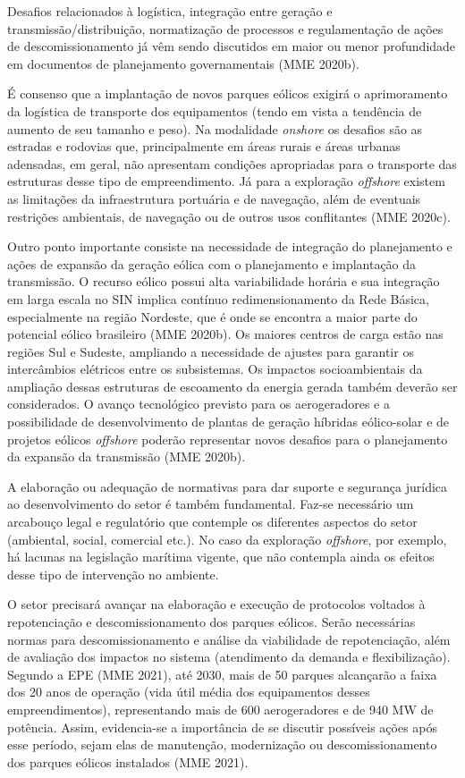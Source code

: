 \documentclass[
  oneside]{scrbook}
\begin{document}
Desafios relacionados à logística, integração entre geração e transmissão/distribuição, normatização de processos e regulamentação de ações de descomissionamento já vêm sendo discutidos em maior ou menor profundidade em documentos de planejamento governamentais (MME 2020b).

É consenso que a implantação de novos parques eólicos exigirá o aprimoramento da logística de transporte dos equipamentos (tendo em vista a tendência de aumento de seu tamanho e peso). Na modalidade \emph{onshore} os desafios são as estradas e rodovias que, principalmente em áreas rurais e áreas urbanas adensadas, em geral, não apresentam condições apropriadas para o transporte das estruturas desse tipo de empreendimento. Já para a exploração \emph{offshore} existem as limitações da infraestrutura portuária e de navegação, além de eventuais restrições ambientais, de navegação ou de outros usos conflitantes (MME 2020c).

Outro ponto importante consiste na necessidade de integração do planejamento e ações de expansão da geração eólica com o planejamento e implantação da transmissão. O recurso eólico possui alta variabilidade horária e sua integração em larga escala no SIN implica contínuo redimensionamento da Rede Básica, especialmente na região Nordeste, que é onde se encontra a maior parte do potencial eólico brasileiro (MME 2020b). Os maiores centros de carga estão nas regiões Sul e Sudeste, ampliando a necessidade de ajustes para garantir os intercâmbios elétricos entre os subsistemas. Os impactos socioambientais da ampliação dessas estruturas de escoamento da energia gerada também deverão ser considerados. O avanço tecnológico previsto para os aerogeradores e a possibilidade de desenvolvimento de plantas de geração híbridas eólico-solar e de projetos eólicos \emph{offshore} poderão representar novos desafios para o planejamento da expansão da transmissão (MME 2020b).

A elaboração ou adequação de normativas para dar suporte e segurança jurídica ao desenvolvimento do setor é também fundamental. Faz-se necessário um arcabouço legal e regulatório que contemple os diferentes aspectos do setor (ambiental, social, comercial etc.). No caso da exploração \emph{offshore}, por exemplo, há lacunas na legislação marítima vigente, que não contempla ainda os efeitos desse tipo de intervenção no ambiente.

O setor precisará avançar na elaboração e execução de protocolos voltados à repotenciação e descomissionamento dos parques eólicos. Serão necessárias normas para descomissionamento e análise da viabilidade de repotenciação, além de avaliação dos impactos no sistema (atendimento da demanda e flexibilização). Segundo a EPE (MME 2021), até 2030, mais de 50 parques alcançarão a faixa dos 20 anos de operação (vida útil média dos equipamentos desses empreendimentos), representando mais de 600 aerogeradores e de 940 MW de potência. Assim, evidencia-se a importância de se discutir possíveis ações após esse período, sejam elas de manutenção, modernização ou descomissionamento dos parques eólicos instalados (MME 2021).
\end{document}
